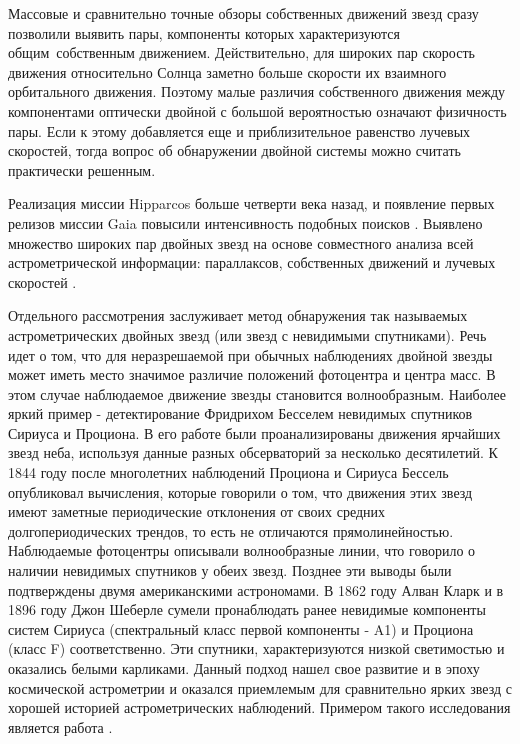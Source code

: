 Массовые и сравнительно точные обзоры собственных движений звезд сразу позволили выявить пары, компоненты которых характеризуются \glqq общим\grqq\ собственным движением. Действительно, для широких пар  скорость движения относительно Солнца заметно больше скорости их взаимного орбитального движения. Поэтому малые различия собственного движения между компонентами оптически двойной с большой вероятностью означают физичность пары. Если к этому добавляется еще и приблизительное равенство лучевых скоростей, тогда вопрос об обнаружении двойной системы можно считать практически решенным.

Реализация миссии Hipparcos больше четверти века назад, и появление первых релизов миссии Gaia повысили интенсивность подобных поисков . Выявлено множество широких пар двойных звезд на основе совместного анализа всей астрометрической информации: параллаксов, собственных движений и лучевых скоростей .

Отдельного рассмотрения заслуживает метод обнаружения так называемых астрометрических двойных звезд (или звезд с невидимыми спутниками). Речь идет о том, что для неразрешаемой при обычных наблюдениях двойной звезды может иметь место значимое различие положений фотоцентра и центра масс. В этом случае наблюдаемое движение звезды становится волнообразным. Наиболее яркий пример - детектирование Фридрихом Бесселем невидимых спутников Сириуса и Проциона. В его работе были проанализированы движения ярчайших звезд неба, используя данные разных обсерваторий за несколько десятилетий. К 1844 году после многолетних наблюдений Проциона и Сириуса Бессель опубликовал вычисления, которые говорили о том, что движения этих звезд имеют заметные периодические отклонения от своих средних долгопериодических трендов, то есть не отличаются прямолинейностью. Наблюдаемые фотоцентры описывали волнообразные линии, что говорило о наличии невидимых спутников у обеих звезд. Позднее эти выводы были подтверждены двумя американскими астрономами. В 1862 году Алван Кларк и в 1896 году Джон Шеберле сумели пронаблюдать ранее невидимые компоненты систем Сириуса (спектральный класс первой компоненты - A1) и Проциона (класс F) соответственно. Эти спутники, характеризуются низкой светимостью и оказались белыми карликами. Данный подход нашел свое развитие и в эпоху космической астрометрии и оказался приемлемым для сравнительно ярких звезд с хорошей историей астрометрических наблюдений. Примером такого исследования является работа .

